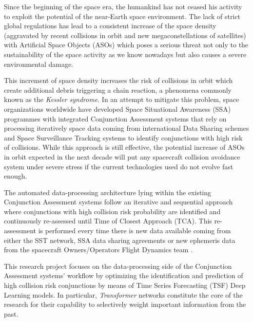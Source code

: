 


Since the beginning of the space era, the humankind has not ceased his activity to exploit the potential of the near-Earth space environment. The lack of strict global regulations has lead to a consistent increase of the space density (aggravated by recent collisions in orbit and new megaconstellations of satellites) with Artificial Space Objects (ASOs) which poses a serious threat not only to the sustainability of the  space activity as we know nowadays but also causes a severe environmental damage. 

This increment of space density increases the risk of collisions in orbit which create additional debris triggering a chain reaction, a phenomena commonly known as the \textit{Kessler syndrome}. In an attempt to mitigate this problem, space organizations worldwide have developed Space Situational Awareness (SSA) programmes with integrated Conjunction Assessment systems that rely on processing iteratively space data coming from international Data Sharing schemes and Space Surveillance Tracking systems to identify conjunctions with high risk of collisions. While this approach is still effective, the potential increase of ASOs in orbit expected in the next decade will put any spacecraft collision avoidance system under severe stress if the current technologies used do not evolve fast enough.

The automated data-processing architecture lying within the existing Conjunction Assessment systems follow an iterative and sequential approach where conjunctions with high collision risk probability are identified and continuously re-assessed until Time of Closest Approach (TCA). This re-assessment is performed every time there is new data available coming from either the SST network, SSA data sharing agreements or new ephemeris data from the spacecraft Owners/Operators Flight Dynamics team \cite{Merz-2021-CAServices}\cite{USSPACECOM-2009-SpaceTrack}.

This research project focuses on the data-processing side of the Conjunction Assessment systems' workflow by optimizing the identification and prediction of high collision risk conjunctions by means of Time Series Forecasting (TSF) Deep Learning models. In particular, \textit{Transformer} networks constitute the core of the research for their capability to selectively weight important information from the past\cite{Shi-2022-TSF}.